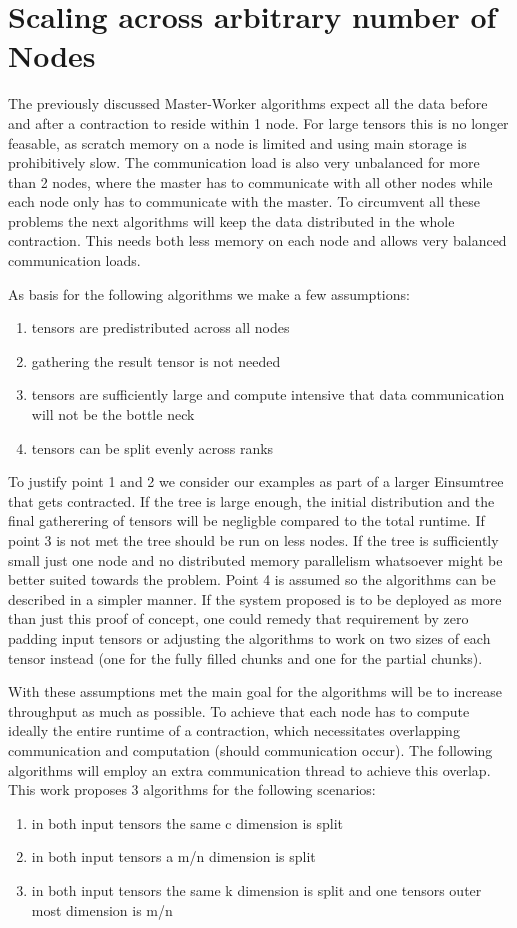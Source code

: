 \section{Scaling across arbitrary number of Nodes}

The previously discussed Master-Worker algorithms expect all the data before and after a contraction to reside within 1 node.
For large tensors this is no longer feasable, as scratch memory on a node is limited and using main storage is prohibitively slow.
The communication load is also very unbalanced for more than 2 nodes, where the master has to communicate with all other nodes while each node only has to communicate with the master.
To circumvent all these problems the next algorithms will keep the data distributed in the whole contraction.
This needs both less memory on each node and allows very balanced communication loads.

As basis for the following algorithms we make a few assumptions:
\begin{enumerate}
    \item tensors are predistributed across all nodes 
    \item gathering the result tensor is not needed
    \item tensors are sufficiently large and compute intensive that data communication will not be the bottle neck
    \item tensors can be split evenly across ranks
\end{enumerate}

To justify point 1 and 2 we consider our examples as part of a larger Einsumtree that gets contracted.
If the tree is large enough, the initial distribution and the final gatherering of tensors will be negligble compared to the total runtime.
If point 3 is not met the tree should be run on less nodes.
If the tree is sufficiently small just one node and no distributed memory parallelism whatsoever might be better suited towards the problem.
Point 4 is assumed so the algorithms can be described in a simpler manner.
If the system proposed is to be deployed as more than just this proof of concept, one could remedy that requirement by zero padding input tensors or adjusting the algorithms to work on two sizes of each tensor instead (one for the fully filled chunks and one for the partial chunks).

With these assumptions met the main goal for the algorithms will be to increase throughput as much as possible.
To achieve that each node has to compute ideally the entire runtime of a contraction, which necessitates overlapping communication and computation (should communication occur).
The following algorithms will employ an extra communication thread to achieve this overlap.
This work proposes 3 algorithms for the following scenarios:
\begin{enumerate}
    \item in both input tensors the same c dimension is split
    \item in both input tensors a m/n dimension is split
    \item in both input tensors the same k dimension is split and one tensors outer most dimension is m/n
\end{enumerate}

